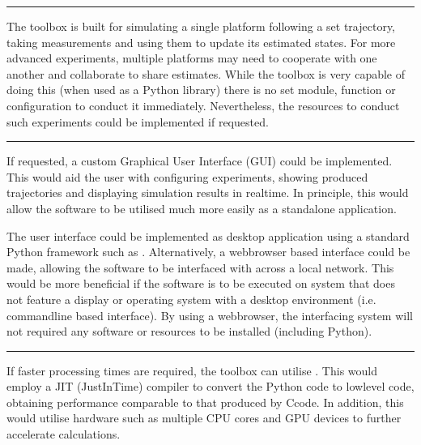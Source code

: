\documentclass[letterpaper,10pt,english]{sphinxmanual}
\begin{document}
\bigskip\hrule\bigskip

\begin{description}
\sphinxAtStartPar
The toolbox is built for simulating a single platform following a set trajectory, taking measurements and using
them to update its estimated states. For more advanced experiments, multiple platforms may need to cooperate with
one another and collaborate to share estimates. While the toolbox is very capable of doing this (when used as a
Python library) there is no set module, function or configuration to conduct it immediately. Nevertheless, the
resources to conduct such experiments could be implemented if requested.

\end{description}


\bigskip\hrule\bigskip

\begin{description}
\sphinxAtStartPar
If requested, a custom Graphical User Interface (GUI) could be implemented. This would aid the user with
configuring experiments, showing produced trajectories and displaying simulation results in real\sphinxhyphen{}time. In
principle, this would allow the software to be utilised much more easily as a standalone application.

\sphinxAtStartPar
The user interface could be implemented as desktop application using a standard Python framework such as
. Alternatively, a web\sphinxhyphen{}browser based interface could be
made, allowing the software to be interfaced with across a local network. This would be more beneficial if the
software is to be executed on system that does not feature a display or operating system with a desktop
environment (i.e. command\sphinxhyphen{}line based interface). By using a web\sphinxhyphen{}browser, the interfacing system will not required
any software or resources to be installed (including Python).

\end{description}


\bigskip\hrule\bigskip

\begin{description}
\sphinxAtStartPar
If faster processing times are required, the toolbox can utilise . This would
employ a JIT (Just\sphinxhyphen{}In\sphinxhyphen{}Time) compiler to convert the Python code to low\sphinxhyphen{}level code, obtaining performance comparable
to that produced by C\sphinxhyphen{}code. In addition, this would utilise hardware such as multiple CPU cores and GPU devices
to further accelerate calculations.

\end{description}
\end{document}
